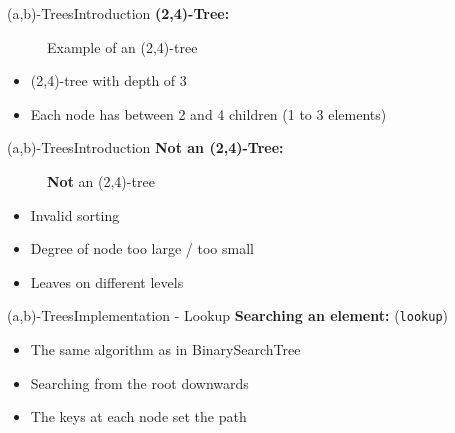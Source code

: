 
\begin{frame}{(a,b)-Trees}{Introduction}
  \textbf{(2,4)-Tree:}
    \begin{figure}
    \begin{adjustbox}{width=0.75\linewidth}
      
    \end{adjustbox}
    \caption{Example of an (2,4)-tree}
    \label{fig:a_b_tree:tree_introduction}
    \end{figure}
   \vspace{-1.0em}
  \begin{itemize}
    \item<2->
      (2,4)-tree with depth of 3
    \item<3->
      Each node has between 2 and 4 children (1 to 3 elements)
  \end{itemize}
\end{frame}


\begin{frame}{(a,b)-Trees}{Introduction}
  \textbf{Not an (2,4)-Tree:}
   \begin{figure}
    \begin{adjustbox}{width=0.5\linewidth}
      
    \end{adjustbox}
    \caption{\textbf{Not} an (2,4)-tree}
    \label{fig:a_b_tree:tree_invalid_introduction}
   \end{figure}
  \vspace{-1.0em}
  \begin{itemize}
    \item<2->
      Invalid sorting
    \item<3->
      Degree of node too large / too small
    \item<4->
      Leaves on different levels
  \end{itemize}
\end{frame}


\begin{frame}{(a,b)-Trees}{Implementation - Lookup}
  \textbf{Searching an element:} (\texttt{\color{Mittel-Blau}lookup})
  \begin{itemize}
    \item<2->
      The same algorithm as in {\color{Mittel-Blau}BinarySearchTree}
    \item<3->
      Searching from the root downwards
    \item<4->
      The keys at each node set the path
  \end{itemize}
\end{frame}

